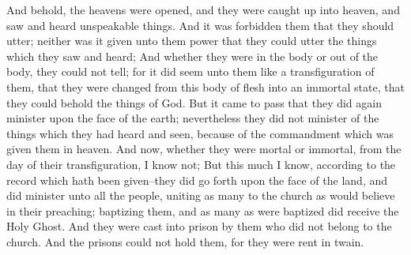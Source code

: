 And behold, the heavens were opened, and they were caught up into heaven, and saw and heard unspeakable things.
\bverse \iffalse And it was forbidden them that they should utter; neither was it given unto them power that they could utter the things which they saw and heard; \fi
And it was forbidden them that they should utter; neither was it given unto them power that they could utter the things which they saw and heard;
\bverse \iffalse And whether they were in the body or out of the body, they could not tell; for it did seem unto them like a transfiguration of them, that they were changed from this body of flesh into an immortal state, that they could behold the things of God. \fi
And whether they were in the body or out of the body, they could not tell; for it did seem unto them like a transfiguration of them, that they were changed from this body of flesh into an immortal state, that they could behold the things of God.
\bverse \iffalse But it came to pass that they did again minister upon the face of the earth; nevertheless they did not minister of the things which they had heard and seen, because of the commandment which was given them in heaven. \fi
But it came to pass that they did again minister upon the face of the earth; nevertheless they did not minister of the things which they had heard and seen, because of the commandment which was given them in heaven.
\bverse \iffalse And now, whether they were mortal or immortal, from the day of their transfiguration, I know not; \fi
And now, whether they were mortal or immortal, from the day of their transfiguration, I know not;
\bverse \iffalse But this much I know, according to the record which hath been given--they did go forth upon the face of the land, and did minister unto all the people, uniting as many to the church as would believe in their preaching; baptizing them, and as many as were baptized did receive the Holy Ghost. \fi
But this much I know, according to the record which hath been given--they did go forth upon the face of the land, and did minister unto all the people, uniting as many to the church as would believe in their preaching; baptizing them, and as many as were baptized did receive the Holy Ghost.
\bverse \iffalse And they were cast into prison by them who did not belong to the church. And the prisons could not hold them, for they were rent in twain. \fi
And they were cast into prison by them who did not belong to the church. And the prisons could not hold them, for they were rent in twain.
